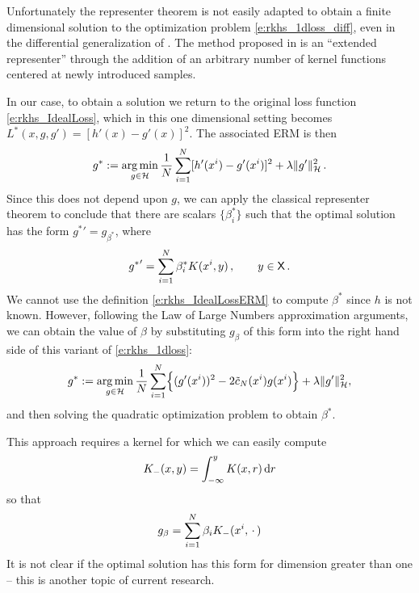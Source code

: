 Unfortunately the representer theorem is not easily adapted to obtain a finite dimensional solution to  the optimization problem \eqref{e:rkhs_1dloss_diff},  even in the differential generalization of  \cite{zho08}. The method proposed in \cite{bhujlaugil} is an ``extended representer'' through the addition of an arbitrary number of kernel functions centered at newly introduced samples.

In our case, to obtain a solution we return to the original loss function \eqref{e:rkhs_IdealLoss}, which in this one dimensional setting becomes $L^*(x,g,g') = [h'(x) - g'(x)]^2$.    The associated ERM is then
\begin{equation}
g^* := \argmin_{g\in\clH} \frac{1}{N} \sum_{i=1}^N [h'(x^i) - g'(x^i)]^2 + \lambda \|g'\|^2_\clH \, .
\label{e:rkhs_IdealLossERM}
\end{equation}
Since this does not depend upon $g$, we can apply the classical representer theorem to conclude that there are scalars $\{\beta^*_i\}$ such that the optimal solution has the form  ${g^*}' = g_{\beta^*}$,  where
\[
{g^*}'  = \sum_{i=1}^N  \beta_i^* K(x^i,y) \,,  \qquad y \in {\sf X} \, .
\]
We cannot use the definition \eqref{e:rkhs_IdealLossERM} to compute $\beta^*$ since $h$ is not known.   However,  following the Law of Large Numbers approximation arguments,   we can obtain the value of $\beta$  by substituting $g_\beta$ of this form into the right hand side  of this variant of \eqref{e:rkhs_1dloss}: 
\begin{equation*}
g^* := \argmin_{g\in\clH} \frac{1}{N} \sum_{i=1}^N \Bigl\{ (g'(x^i))^2 - 2 \tilc_N(x^i) g(x^i) \Bigr\} + \lambda \|g'\|^2_\clH,
\label{e:rkhs_1dlossDiff}
\end{equation*}
and then solving the quadratic optimization problem to obtain $\beta^*$.

This approach requires a kernel   for which we can easily compute
\[
K_-(x,y) = \int_{-\infty}^y  K(x,r)\,  \text{d} r
\]
so that
\[
g_\beta =  \sum_{i=1}^N \beta_i  K_-(x^i,\,\cdot\,)
\]
It is not clear if the optimal solution has this form for dimension greater than one -- this is another topic of current research.


